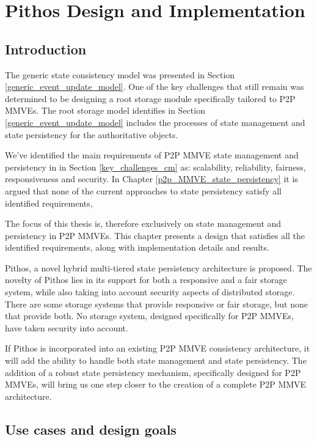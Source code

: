 \chapter{Pithos Design and Implementation}
\label{chp:DESIGN}

\section{Introduction}
The generic state consistency model was presented in Section \ref{generic_event_update_model}. One of the key challenges that still remain was determined to be designing a root storage module specifically tailored to P2P MMVEs. The root storage model identifies in Section \ref{generic_event_update_model} includes the processes of state management and state persistency for the authoritative objects.

We've identified the main requirements of P2P MMVE state management and persistency in in Section \ref{key_challenges_cm} as: scalability,
reliability, fairness, responsiveness and security. In Chapter \ref{p2p_MMVE_state_persistency} it is argued that none of the current approaches to state persistency satisfy all identified requirements,

The focus of this thesis is, therefore exclusively on state management and persistency in P2P MMVEs. This chapter presents a design that satisfies all the identified requirements, along with implementation details and results.

Pithos, a novel hybrid multi-tiered state persistency architecture is
proposed. The novelty of Pithos lies in its support for both a responsive and a fair storage system, while also taking into account security aspects
of distributed storage. There are some storage systems that provide responsive or fair storage, but none that provide both. No storage system, designed specifically for P2P MMVEs, have taken security into account.

If Pithos is incorporated into an existing P2P MMVE consistency architecture, it will add the ability to handle both state management and state persistency. The addition of a robust state persistency mechanism, specifically designed for P2P MMVEs, will bring us one step closer to
the creation of a complete P2P MMVE architecture.

\section{Use cases and design goals}
\label{use_cases_goals}

